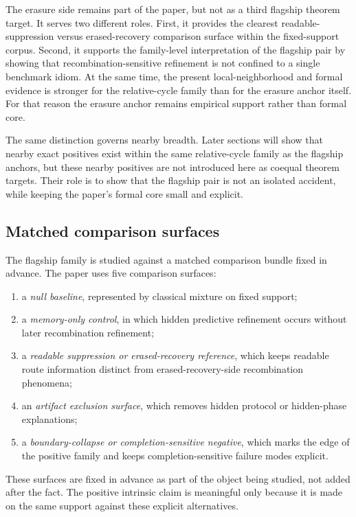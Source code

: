 \documentclass[11pt]{article}
\theoremstyle{definition}
\begin{document}
The erasure side remains part of the paper, but not as a third flagship theorem target. It serves two different roles. First, it provides the clearest readable-suppression versus erased-recovery comparison surface within the fixed-support corpus. Second, it supports the family-level interpretation of the flagship pair by showing that recombination-sensitive refinement is not confined to a single benchmark idiom. At the same time, the present local-neighborhood and formal evidence is stronger for the relative-cycle family than for the erasure anchor itself. For that reason the erasure anchor remains empirical support rather than formal core.

The same distinction governs nearby breadth. Later sections will show that nearby exact positives exist within the same relative-cycle family as the flagship anchors, but these nearby positives are not introduced here as coequal theorem targets. Their role is to show that the flagship pair is not an isolated accident, while keeping the paper's formal core small and explicit.

\subsection{Matched comparison surfaces}

The flagship family is studied against a matched comparison bundle fixed in advance. The paper uses five comparison surfaces:
\begin{enumerate}
    \item a \emph{null baseline}, represented by classical mixture on fixed support;
    \item a \emph{memory-only control}, in which hidden predictive refinement occurs without later recombination refinement;
    \item a \emph{readable suppression or erased-recovery reference}, which keeps readable route information distinct from erased-recovery-side recombination phenomena;
    \item an \emph{artifact exclusion surface}, which removes hidden protocol or hidden-phase explanations;
    \item a \emph{boundary-collapse or completion-sensitive negative}, which marks the edge of the positive family and keeps completion-sensitive failure modes explicit.
\end{enumerate}

These surfaces are fixed in advance as part of the object being studied, not added after the fact. The positive intrinsic claim is meaningful only because it is made on the same support against these explicit alternatives.
\end{document}
